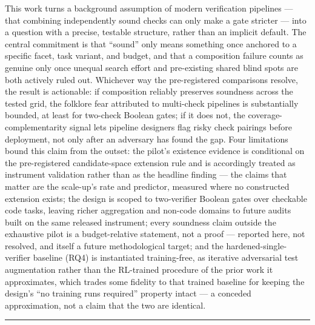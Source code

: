 \documentclass[11pt]{article}
\begin{document}
This work turns a background assumption of modern verification pipelines --- that combining independently sound checks can only make a gate stricter --- into a question with a precise, testable structure, rather than an implicit default. The central commitment is that ``sound'' only means something once anchored to a specific facet, task variant, and budget, and that a composition failure counts as genuine only once unequal search effort and pre-existing shared blind spots are both actively ruled out. Whichever way the pre-registered comparisons resolve, the result is actionable: if composition reliably preserves soundness across the tested grid, the folklore fear attributed to multi-check pipelines is substantially bounded, at least for two-check Boolean gates; if it does not, the coverage-complementarity signal lets pipeline designers flag risky check pairings before deployment, not only after an adversary has found the gap. Four limitations bound this claim from the outset: the pilot's existence evidence is conditional on the pre-registered candidate-space extension rule and is accordingly treated as instrument validation rather than as the headline finding --- the claims that matter are the scale-up's rate and predictor, measured where no constructed extension exists; the design is scoped to two-verifier Boolean gates over checkable code tasks, leaving richer aggregation and non-code domains to future audits built on the same released instrument; every soundness claim outside the exhaustive pilot is a budget-relative statement, not a proof --- reported here, not resolved, and itself a future methodological target; and the hardened-single-verifier baseline (RQ4) is instantiated training-free, as iterative adversarial test augmentation rather than the RL-trained procedure of the prior work it approximates, which trades some fidelity to that trained baseline for keeping the design's ``no training runs required'' property intact --- a conceded approximation, not a claim that the two are identical.

\vspace{1em}
\hrule
\vspace{1em}
\end{document}
